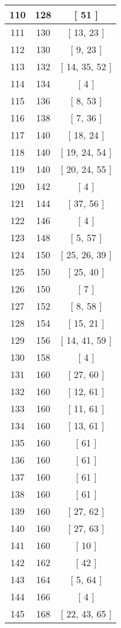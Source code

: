 \begin{center}
\begin{longtable}[H]{|| c c c ||}
\hline
110 & 128 & [ 51 ] \\ 
\hline
111 & 130 & [ 13, 23 ] \\ 
\hline
112 & 130 & [ 9, 23 ] \\ 
\hline
113 & 132 & [ 14, 35, 52 ] \\ 
\hline
114 & 134 & [ 4 ] \\ 
\hline
115 & 136 & [ 8, 53 ] \\ 
\hline
116 & 138 & [ 7, 36 ] \\ 
\hline
117 & 140 & [ 18, 24 ] \\ 
\hline
118 & 140 & [ 19, 24, 54 ] \\ 
\hline
119 & 140 & [ 20, 24, 55 ] \\ 
\hline
120 & 142 & [ 4 ] \\ 
\hline
121 & 144 & [ 37, 56 ] \\ 
\hline
122 & 146 & [ 4 ] \\ 
\hline
123 & 148 & [ 5, 57 ] \\ 
\hline
124 & 150 & [ 25, 26, 39 ] \\ 
\hline
125 & 150 & [ 25, 40 ] \\ 
\hline
126 & 150 & [ 7 ] \\ 
\hline
127 & 152 & [ 8, 58 ] \\ 
\hline
128 & 154 & [ 15, 21 ] \\ 
\hline
129 & 156 & [ 14, 41, 59 ] \\ 
\hline
130 & 158 & [ 4 ] \\ 
\hline
131 & 160 & [ 27, 60 ] \\ 
\hline
132 & 160 & [ 12, 61 ] \\ 
\hline
133 & 160 & [ 11, 61 ] \\ 
\hline
134 & 160 & [ 13, 61 ] \\ 
\hline
135 & 160 & [ 61 ] \\ 
\hline
136 & 160 & [ 61 ] \\ 
\hline
137 & 160 & [ 61 ] \\ 
\hline
138 & 160 & [ 61 ] \\ 
\hline
139 & 160 & [ 27, 62 ] \\ 
\hline
140 & 160 & [ 27, 63 ] \\ 
\hline
141 & 160 & [ 10 ] \\ 
\hline
142 & 162 & [ 42 ] \\ 
\hline
143 & 164 & [ 5, 64 ] \\ 
\hline
144 & 166 & [ 4 ] \\ 
\hline
145 & 168 & [ 22, 43, 65 ] \\ 

\end{longtable}
\end{center}
